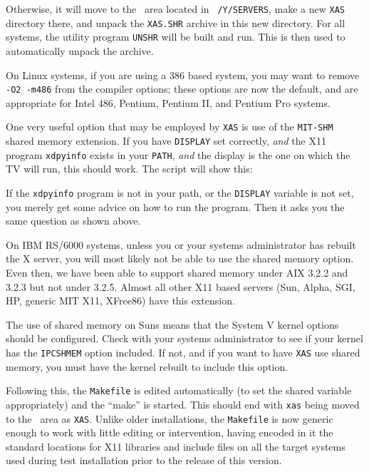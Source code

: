 Otherwise, it will move to the \YSERV\ area located in {\tt
\THISVER/Y/SERVERS}, make a new {\tt XAS} directory there, and unpack
the {\tt XAS.SHR} archive in this new directory.  For all systems, the
utility program {\tt UNSHR} will be built and run.  This is then used to
automatically unpack the archive.

On Linux systems, if you are using a 386 based system, you may want to
remove {\tt -O2 -m486} from the compiler options; these options are now
the default, and are appropriate for Intel 486, Pentium, Pentium II, and
Pentium Pro systems.

One very useful option that may be employed by {\tt XAS} is use of the
{\tt MIT-SHM} shared memory extension.  If you have {\tt DISPLAY} set
correctly, {\it and\/} the X11 program {\tt xdpyinfo} exists in your
{\tt PATH}, {\it and\/} the display is the one on which the TV will run,
this should work.  The script will show this: \medskip


\medskip\noindent If the {\tt xdpyinfo} program is not in your path, or
the {\tt DISPLAY} variable is not set, you merely get some advice on how
to run the program.  Then it asks you the same question as shown above.

On IBM RS/6000 systems, unless you or your systems administrator has
rebuilt the X server, you will most likely not be able to use the shared
memory option.  Even then, we have been able to support shared memory
under AIX 3.2.2 and 3.2.3 but not under 3.2.5.  Almost all other X11
based servers (Sun, Alpha, SGI, HP, generic MIT X11, XFree86) have this
extension.

The use of shared memory on Suns means that the System V kernel options
should be configured.  Check with your systems administrator to see if
your kernel has the {\tt IPCSHMEM} option included.  If not, and if you
want to have {\tt XAS} use shared memory, you must have the kernel
rebuilt to include this option.

Following this, the {\tt Makefile} is edited automatically (to set the
shared variable appropriately) and the ``make'' is started.  This should
end with {\tt xas} being moved to the \LOAD\ area as {\tt XAS}.  Unlike
older installations, the {\tt Makefile} is now generic enough to work
with little editing or intervention, having encoded in it the standard
locations for X11 libraries and include files on all the target systems
used during test installation prior to the release of this version.

